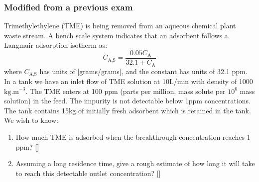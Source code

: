 \begin{frame}\frametitle{Modified from a previous exam}

	Trimethylethylene (TME) is being removed from an aqueous chemical plant waste stream. A bench scale system indicates that an adsorbent follows a Langmuir adsorption isotherm as:
	\[
		C_\text{A,S} = \frac{0.05C_\text{A}}{32.1 + C_\text{A}}
	\]
	where $C_\text{A,S}$ has units of [grams/grams], and the constant has units of 32.1 ppm. In a {} tank we have an inlet flow of TME solution at 10L/min with density of 1000$\text{kg.m}^{-3}$. The TME enters at 100 ppm (parts per million, mass solute per $10^6$ mass solution) in the feed. The impurity is not detectable below 1ppm concentrations. The tank contains 15kg of initially fresh adsorbent which is retained in the tank. We wish to know:

	\begin{enumerate}
		\item	How much TME is adsorbed when the breakthrough concentration reaches 1 ppm? [{\color{myOrange}{Ans: 22.65kg}}]
		\item	Assuming a long residence time, give a rough estimate of how long it will take to reach this detectable outlet concentration? [{\color{myOrange}{15.7 days}}]
	\end{enumerate}
\end{frame}



